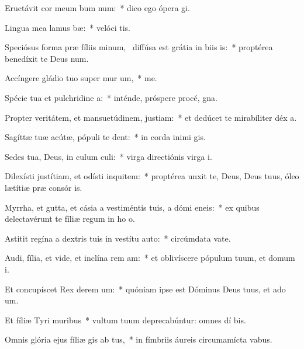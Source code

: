 \item Eructávit cor meum bum num:~* dico ego ópera  gi.
\item Lingua mea lamus bæ:~* velóci tis.
\item Speciósus forma præ fíliis minum,~\pscross{} diffúsa est grátia in biis is:~* proptérea benedíxit te Deus  num.
\item Accíngere gládio tuo super mur um,~* me.
\item Spécie tua et pulchridine a:~* inténde, próspere procé,  gna.
\item Propter veritátem, et mansuetúdinem,  justiam:~* et dedúcet te mirabíliter déx a.
\item Sagíttæ tuæ acútæ, pópuli  te dent:~* in corda inimi gis.
\item Sedes tua, Deus, in culum culi:~* virga directiónis virga  i.
\item Dilexísti justítiam, et odísti inquitem:~* proptérea unxit te, Deus, Deus tuus, óleo lætítiæ præ consór is.
\item Myrrha, et gutta, et cásia a vestiméntis tuis, a dómi eneis:~* ex quibus delectavérunt te fíliæ regum in ho o.
\item Astitit regína a dextris tuis in vestítu auto:~* circúmdata vate.
\item Audi, fília, et vide, et inclína rem am:~* et oblivíscere pópulum tuum, et domum  i.
\item Et concupíscet Rex derem um:~* quóniam ipse est Dóminus Deus tuus, et ado um.
\item Et fíliæ Tyri  muribus~* vultum tuum deprecabúntur: omnes dí bis.
\item Omnis glória ejus fíliæ gis ab tus,~* in fímbriis áureis circumamícta vabus.
